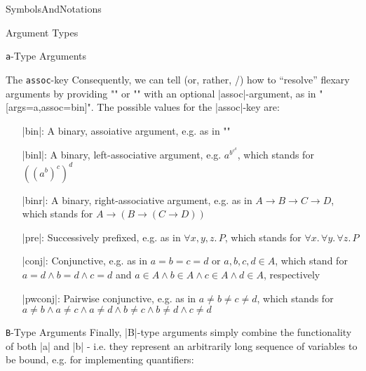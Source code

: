 \begin{smodule}[ns=https://github.com/slatex/sTeX/doc]{SymbolsAndNotations}
\begin{sfragment}{Argument Types}
\begin{sfragment}{\texttt a-Type Arguments}
\begin{sfragment}{The \texttt{assoc}-key}
            Consequently, we can tell \sTeX (or, rather, \mmt/\omdoc)
            how to ``resolve'' flexary arguments by providing
            \stexcode"\symdecl" or \stexcode"\symdef" with
            an optional |assoc|-argument, as in
            \stexcode"[args=a,assoc=bin]".
            The possible values for the |assoc|-key are:
            \begin{itemize}
                \item[|bin|:] A binary, assoiative argument, e.g.
                    as in \stexcode"\addition"
                \item[|binl|:] A binary, left-associative argument, e.g.
                    $a^{\scriptstyle b^{\scriptstyle c^d}}$, which stands for $((a^b)^c)^d$
                \item[|binr|:] A binary, right-associative argument,
                    e.g. as in $A\to B\to C\to D$, which stands
                    for $A \to (B \to (C \to D))$
                \item[|pre|:] Successively prefixed, e.g. as in
                    $\forall x,y,z.\,P$, which stands for
                    $\forall x.\, \forall y.\, \forall z.\,P$
                \item[|conj|:] Conjunctive, e.g. as in
                    $a=b=c=d$ or $a,b,c,d\in A$, which stand for
                    $a=d\wedge b=d\wedge c=d$ and $a\in A\wedge b\in A
                    \wedge c\in A\wedge d\in A$, respectively
                \item[|pwconj|:] Pairwise conjunctive, e.g. as in
                    $a\neq b\neq c\neq d$, which stands for
                    $a\neq b\wedge a\neq c\wedge a\neq d\wedge b\neq c\wedge b\neq d\wedge c\neq d$
            \end{itemize}
        \end{sfragment}

    \end{sfragment}
    
    \begin{sfragment}{\texttt B-Type Arguments}
        Finally, |B|-type arguments simply combine the functionality
        of both |a| and |b| - i.e. they represent an arbitrarily
        long sequence of variables to be bound, e.g. for implementing
        quantifiers:

    \end{sfragment}


\end{sfragment}
\end{smodule}
